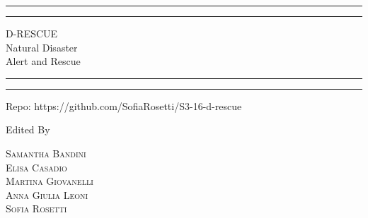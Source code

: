 \documentclass[10pt,english]{article}
\begin{document}
\begin{titlepage} %

	\centering %
	
	\scshape %
	
	\vspace*{\baselineskip} %
	
	
	\rule{\textwidth}{1.6pt}\vspace*{-\baselineskip}\vspace*{2pt} %
	\rule{\textwidth}{0.4pt} %
	
	\vspace{0.75\baselineskip} %
	
	{\LARGE  D-RESCUE \\Natural Disaster\\Alert and Rescue} %
	
	\vspace{0.75\baselineskip} %
	
	\rule{\textwidth}{0.4pt}\vspace*{-\baselineskip}\vspace{3.2pt} %
	\rule{\textwidth}{1.6pt} %
	
	\vspace{2\baselineskip} %
	
	
	
	Repo: https://github.com/SofiaRosetti/S3-16-d-rescue %
	
	\vspace*{3\baselineskip} %
	
	
	Edited By
	
	\vspace{0.5\baselineskip} %
	
	{\scshape\Large Samantha Bandini \\ Elisa Casadio \\ Martina Giovanelli \\ Anna Giulia Leoni \\ Sofia Rosetti} %
	

\end{titlepage}
\end{document}
